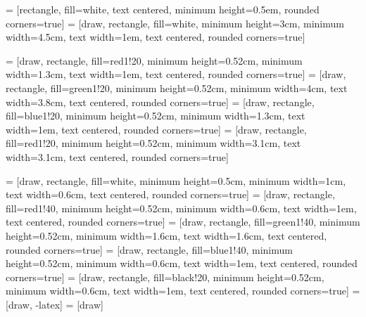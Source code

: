  = [rectangle, fill=white, text centered, minimum height=0.5em, rounded corners=true]
 = [draw, rectangle, fill=white, minimum height=3cm, minimum width=4.5cm, text width=1em, text centered, rounded corners=true]

 = [draw, rectangle, fill=red1!20,   minimum height=0.52cm, minimum width=1.3cm, text width=1em, text centered, rounded corners=true]
 = [draw, rectangle, fill=green1!20, minimum height=0.52cm, minimum width=4cm, text width=3.8cm, text centered, rounded corners=true]
 = [draw, rectangle, fill=blue1!20,  minimum height=0.52cm, minimum width=1.3cm, text width=1em, text centered, rounded corners=true]
  = [draw, rectangle, fill=red1!20,   minimum height=0.52cm, minimum width=3.1cm, text width=3.1cm, text centered, rounded corners=true]

 = [draw, rectangle, fill=white, minimum height=0.5cm, minimum width=1cm, text width=0.6cm, text centered, rounded corners=true]
 = [draw, rectangle, fill=red1!40, minimum height=0.52cm, minimum width=0.6cm, text width=1em, text centered, rounded corners=true]
 = [draw, rectangle, fill=green1!40, minimum height=0.52cm, minimum width=1.6cm, text width=1.6cm, text centered, rounded corners=true]
 = [draw, rectangle, fill=blue1!40, minimum height=0.52cm, minimum width=0.6cm, text width=1em, text centered, rounded corners=true]
 = [draw, rectangle, fill=black!20, minimum height=0.52cm, minimum width=0.6cm, text width=1em, text centered, rounded corners=true]
 = [draw, -latex]
 = [draw]



